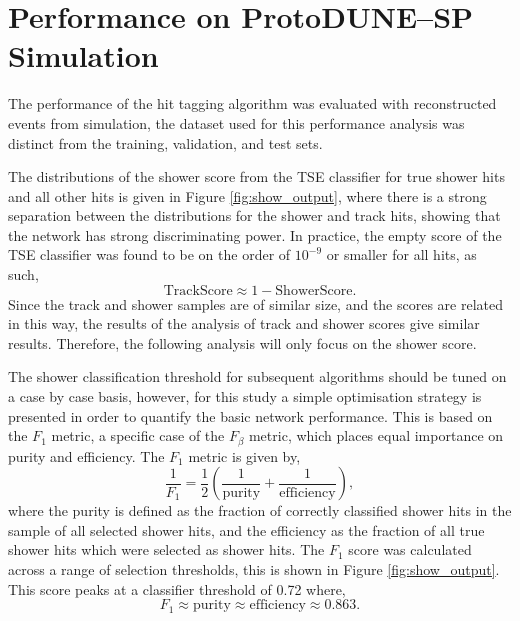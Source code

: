 \section{Performance on ProtoDUNE--SP Simulation} \label{cnn-perf-sim}

The performance of the hit tagging algorithm was evaluated with reconstructed
events from \protodune{} simulation, the dataset used for this performance
analysis was distinct from the training, validation, and test sets. 

The distributions of the shower score from the TSE classifier for true shower 
hits and all other hits is given in Figure \ref{fig:show_output}, where there is a 
strong separation between the distributions for the shower and track hits, 
showing that the network has strong discriminating power. In practice, the 
empty score of the TSE classifier was found to be on the order of $10^{-9}$ or 
smaller for all hits, as such,
\begin{equation*}
	\mbox{TrackScore} \approx 1 - \mbox{ShowerScore}.
\end{equation*}
Since the track and shower samples are of similar size, and the scores are
related in this way, the results of the analysis of track and shower scores 
give similar results. Therefore, the following analysis will only focus on the 
shower score.

The shower classification threshold for subsequent algorithms should be tuned on
a case by case basis, however, for this study a simple optimisation strategy 
is presented in order to quantify the basic network performance. This is based
on the $F_1$ metric, a specific case of the $F_\beta$ 
metric\cite{VanRijsbergenC.J.1975Ir}, which places equal importance on 
purity and efficiency. The $F_1$ metric is given by, 
\begin{equation*}
	\frac{1}{F_1} = \frac{1}{2} \left( \frac{1}{\mbox{purity}} +
	\frac{1}{\mbox{efficiency}} \right),
\end{equation*}
where the purity is defined as the fraction of correctly classified shower 
hits in the sample of all selected shower hits, and the efficiency as the 
fraction of all true shower hits which were selected as shower hits. The $F_1$ 
score was calculated across a range of selection thresholds, this is shown in 
Figure \ref{fig:show_output}. This score peaks at a classifier threshold of 
0.72 where, 
\begin{equation*} 
	F_1 \approx \mbox{purity} \approx \mbox{efficiency} \approx 0.863.
\end{equation*}

